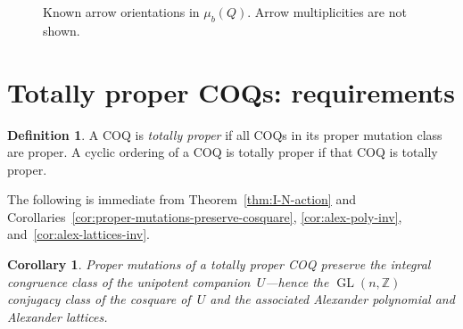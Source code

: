\documentclass[11pt, letterpaper]{amsart}
\newtheorem{corollary}[theorem]{Corollary}
\theoremstyle{definition}
\newtheorem{definition}[theorem]{Definition}
\numberwithin{equation}{section}
\def\ZZ{{\mathbb Z}}
\def\GL{{\operatorname{GL}}}
\begin{document}
\begin{figure}[ht]%
{
\newcommand{\radius}{1.2cm} %
\newcommand{\out}{-{stealth}}
\newcommand{\ine}{{stealth}-}
\newcommand\OriQuiv[8]{%
	\filldraw[black] (#1,#2)++(135:\radius) circle (2pt) node[above left=-1pt] {$b$} coordinate (b);
	\filldraw[black] (#1,#2)++(45:\radius) circle (2pt) node[above right=-1pt] {$a$} coordinate (a);
	\filldraw[black] (#1,#2)++(-45:\radius) circle (2pt) node[below right=-1pt] {$c$} coordinate (c);
	\filldraw[black] (#1,#2)++(-135:\radius) circle (2pt) node[below left=-1pt] {$d$} coordinate (d);
	\draw[black, dashed, decoration={markings, mark=at position 0 with {\arrow{<}}}, postaction={decorate}] (#1,#2) circle (\radius);
	\draw[black, #3, shorten >=3pt, shorten <= 3pt] (d) -- (a);
	\draw[black, #4, shorten >=3pt, shorten <= 3pt] (a) -- (b);
	\draw[black, #5, shorten >=3pt, shorten <= 3pt] (b) -- (c);
	\draw[black, #6, shorten >=3pt, shorten <= 3pt] (d) -- (b);
	\draw[black, #7, shorten >=3pt, shorten <= 3pt] (a) -- (c);
	\draw[black, #8, shorten >=3pt, shorten <= 3pt] (d) -- (c);
}
} %
\caption{Known arrow orientations in $\mu_b(Q)$. Arrow multiplicities are not shown.}
\label{fig:mutated b cyclic}
\end{figure}



\newpage

\section{Totally proper COQs: requirements}
\label{sec:totally proper}

\begin{definition}
\label{def:totally-proper}
 A COQ is \emph{totally proper} if all COQs in its proper mutation class are proper.
 A cyclic ordering of a COQ is totally proper if that COQ is totally proper.
\end{definition}

The following is immediate from Theorem~\ref{thm:I-N-action}
and Corollaries~\ref{cor:proper-mutations-preserve-cosquare}, \ref{cor:alex-poly-inv}, and~\ref{cor:alex-lattices-inv}.%

\begin{corollary}
\label{cor:proper preserves}
Proper mutations of a totally proper COQ preserve the integral congruence class of the unipotent companion~$U$---hence 
the $\GL(n,\ZZ)$ conjugacy class of the cosquare of~$U$ and the associated Alexander polynomial and Alexander lattices.
\end{corollary}
\end{document}
